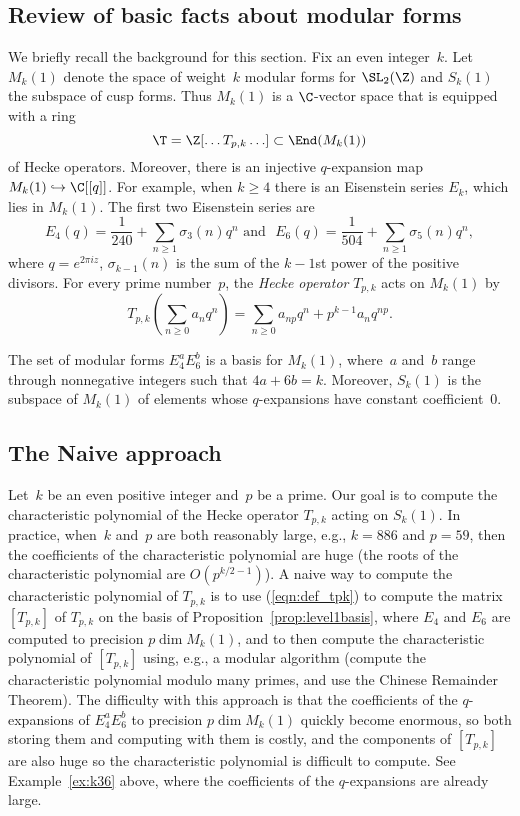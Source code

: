 \documentclass{report}
\begin{document}
\subsection{Review of basic facts about modular forms}
We briefly recall the background for this section.  Fix an even
integer~$k$.  Let $M_k(1)$ denote the space of weight~$k$ modular
forms for $\SL_2(\Z)$ and $S_k(1)$ the subspace of cusp forms.
Thus $M_k(1)$ is a $\C$-vector space that is equipped with a ring
$$\T=\Z[\ldots T_{p,k} \ldots] \subset \End(M_k(1))$$ of Hecke
operators.  Moreover, there is an injective $q$-expansion map
$M_k(1)\hookrightarrow \C[[q]]$.  For example, when $k \geq 4$
there is an Eisenstein series $E_k$, which lies in $M_k(1)$. The
first two Eisenstein series are
$$
E_4(q) = \frac{1}{240} + \sum_{n\geq 1} \sigma_3(n) q^n \,\,\text{
and }\,\, E_6(q) = \frac{1}{504} + \sum_{n\geq 1} \sigma_5(n) q^n,
$$
where $q=e^{2\pi{}iz}$, $\sigma_{k-1}(n)$ is the sum of the
$k-1$st power of the positive divisors.  For every prime
number~$p$, the {\em Hecke operator} $T_{p,k}$ acts on $M_k(1)$ by
\begin{equation}\label{eqn:def_tpk}
  T_{p,k}\left(\sum_{n\geq 0} a_n q^n\right)
   = \sum_{n\geq 0} a_{np}q^n + p^{k-1} a_n q^{np}.
\end{equation}
\begin{proposition}\label{prop:level1basis}
The set of modular forms $E_4^a E_6^b$ is a basis for $M_k(1)$,
where~$a$ and~$b$ range through nonnegative integers such that
$4a+6b=k$. Moreover, $S_k(1)$ is the subspace of $M_k(1)$ of
elements whose $q$-expansions have constant coefficient~$0$.
\end{proposition}

\subsection{The Naive approach}
Let~$k$ be an even positive integer and~$p$ be a prime.  Our goal
is to compute the characteristic polynomial of the Hecke operator
$T_{p,k}$ acting on $S_k(1)$.  In practice, when~$k$ and~$p$ are
both reasonably large, e.g., $k=886$ and $p=59$, then the
coefficients of the characteristic polynomial are huge (the roots
of the characteristic polynomial are $O(p^{k/2-1})$).  A naive way
to compute the characteristic polynomial of $T_{p,k}$ is to use
(\ref{eqn:def_tpk}) to compute the matrix $[T_{p,k}]$ of $T_{p,k}$
on the basis of Proposition~\ref{prop:level1basis}, where $E_4$ and
$E_6$ are computed to precision $p \dim M_k(1)$, and to then
compute the characteristic polynomial of $[T_{p,k}]$ using, e.g.,
a modular algorithm (compute the characteristic polynomial modulo
many primes, and use the Chinese Remainder Theorem). The
difficulty with this approach is that the coefficients of the
$q$-expansions of $E_4^a E_6^b$ to precision $p\dim M_k(1)$
quickly become enormous, so both storing them and computing with
them is costly, and the components of $[T_{p,k}]$ are also huge so
the characteristic polynomial is difficult to compute. See
Example~\ref{ex:k36} above, where the coefficients of the
$q$-expansions are already large.
\end{document}
